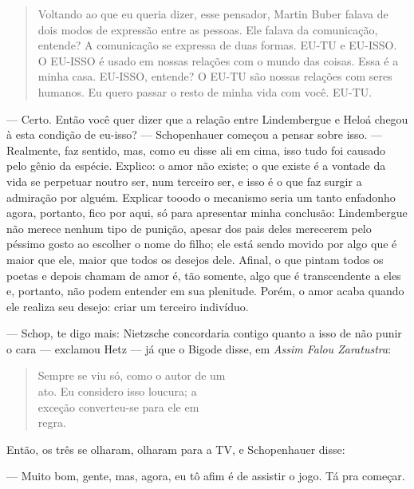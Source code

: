 \begin{quotation}
Voltando ao que eu queria dizer, esse pensador, Martin Buber falava de dois modos de expressão entre as pessoas. Ele falava da comunicação, entende? A comunicação se expressa de duas formas. EU-TU e EU-ISSO. O EU-ISSO é usado em nossas relações com o mundo das coisas. Essa é a minha casa. EU-ISSO, entende? O EU-TU são nossas relações com seres humanos. Eu quero passar o resto de minha vida com você. EU-TU.
\end{quotation}

--- Certo. Então você quer dizer que a relação entre Lindembergue e Heloá chegou à esta condição de eu-isso? --- Schopenhauer começou a pensar sobre isso. --- Realmente, faz sentido, mas, como eu disse ali em cima, isso tudo foi causado pelo gênio da espécie. Explico: o amor não existe; o que existe é a vontade da vida se perpetuar noutro ser, num terceiro ser, e isso é o que faz surgir a admiração por alguém. Explicar tooodo o mecanismo seria um tanto enfadonho agora, portanto, fico por aqui, só para apresentar minha conclusão: Lindembergue não merece nenhum tipo de punição, apesar dos pais deles merecerem pelo péssimo gosto ao escolher o nome do filho; ele está sendo movido por algo que é maior que ele, maior que todos os desejos dele. Afinal, o que pintam todos os poetas e depois chamam de amor é, tão somente, algo que é transcendente a eles e, portanto, não podem entender em sua plenitude. Porém, o amor acaba quando ele realiza seu desejo: criar um terceiro indivíduo.

--- Schop, te digo mais: Nietzsche concordaria contigo quanto a isso de não punir o cara --- exclamou Hetz --- já que o Bigode disse, em \emph{Assim Falou Zaratustra}:

\begin{quotation}
\noindent Sempre se viu só, como o autor de um\\
ato. Eu considero isso loucura; a\\
exceção converteu-se para ele em\\
regra.\\
\end{quotation}

Então, os três se olharam, olharam para a TV, e Schopenhauer disse:

--- Muito bom, gente, mas, agora, eu tô afim é de assistir o jogo. Tá pra começar.
